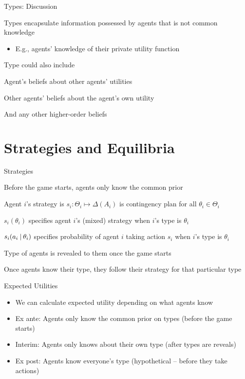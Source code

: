 \documentclass[11pt,aspectratio=169]{beamer}
\begin{document}
  
  \begin{frame}{Types: Discussion}
   \begin{itemizes}
    \item Types encapsulate information possessed by agents that is \alert{not} common knowledge
    \begin{itemize}
     \item E.g., agents' knowledge of their private utility function
    \end{itemize}
    \item Type could also include
    \begin{itemizes}[0.7em]
     \item Agent's beliefs about other agents' utilities
     \item Other agents' beliefs about the agent's own utility
     \item And any other higher-order beliefs
    \end{itemizes}
   \end{itemizes}
  \end{frame}
  
 \section{Strategies and Equilibria}

  \begin{frame}{Strategies}
   \begin{itemizes}[1.2em]
    \item \alert{Before} the game starts, agents only know the common prior
    \item Agent $i$'s strategy is $s_i: \Theta_i \mapsto \Delta(A_i)$ is \alert{contingency plan} for all $\theta_i \in \Theta_i$
    \item $s_i(\theta_i)$ specifies agent $i$'s (mixed) strategy when $i$'s type is $\theta_i$
    \item $s_i(a_i \:\vert\: \theta_i)$ specifies probability of agent $i$ taking action $s_i$ when $i$'s type is $\theta_i$
    \item Type of agents is \alert{revealed} to them once the game \alert{starts}
    \item Once agents know their type, they follow their strategy for that particular type
   \end{itemizes}
  \end{frame}
  
  
  \begin{frame}{Expected Utilities}
   \begin{itemize}[<+->]
   \setlength{\itemsep}{1.5em}
    \item We can calculate expected utility depending on what agents know
    \item \alert{Ex ante}: Agents only know the common prior on types (before the game starts)
    \item \alert{Interim}: Agents only knows about their own type (after types are reveals)
    \item \alert{Ex post}: Agents know everyone's type (hypothetical -- before they take actions)
   \end{itemize}
  \end{frame}
\end{document}
